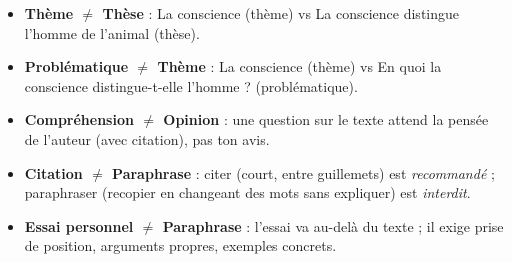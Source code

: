 \documentclass[11pt]{article}
\begin{document}
\begin{exemplebox}
\begin{itemize}
\item \textbf{Thème $\neq$ Thèse} : \og La conscience \fg (thème) vs \og La conscience distingue l'homme de l'animal \fg (thèse).
\item \textbf{Problématique $\neq$ Thème} : \og La conscience \fg (thème) vs \og En quoi la conscience distingue-t-elle l'homme ? \fg (problématique).
\item \textbf{Compréhension $\neq$ Opinion} : une question sur le texte attend la pensée de l'auteur (avec citation), pas ton avis.
\item \textbf{Citation $\neq$ Paraphrase} : citer (court, entre guillemets) est \emph{recommandé} ; paraphraser (recopier en changeant des mots sans expliquer) est \emph{interdit}.
\item \textbf{Essai personnel $\neq$ Paraphrase} : l'essai va au-delà du texte ; il exige prise de position, arguments propres, exemples concrets.
\end{itemize}
\end{exemplebox}
\end{document}

